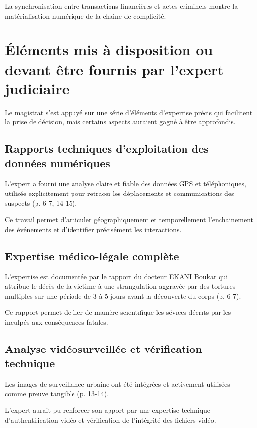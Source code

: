 \documentclass[12pt,a4paper]{article}
\begin{document}
	La synchronisation entre transactions financières et actes criminels montre la matérialisation numérique de la chaine de complicité.
	
	\section{Éléments mis à disposition ou devant être fournis par l'expert judiciaire}
	
	Le magistrat s'est appuyé sur une série d'éléments d'expertise précis qui facilitent la prise de décision, mais certains aspects auraient gagné à être approfondis.
	
	\subsection{Rapports techniques d'exploitation des données numériques}
	
	L'expert a fourni une analyse claire et fiable des données GPS et téléphoniques, utilisée explicitement pour retracer les déplacements et communications des suspects (p. 6-7, 14-15).
	
	Ce travail permet d'articuler géographiquement et temporellement l'enchainement des événements et d'identifier précisément les interactions.
	
	\subsection{Expertise médico-légale complète}
	
	L'expertise est documentée par le rapport du docteur EKANI Boukar qui attribue le décès de la victime à une strangulation aggravée par des tortures multiples sur une période de 3 à 5 jours avant la découverte du corps (p. 6-7).
	
	Ce rapport permet de lier de manière scientifique les sévices décrits par les inculpés aux conséquences fatales.
	
	\subsection{Analyse vidéosurveillée et vérification technique}
	
	Les images de surveillance urbaine ont été intégrées et activement utilisées comme preuve tangible (p. 13-14).
	
	L'expert aurait pu renforcer son apport par une expertise technique d'authentification vidéo et vérification de l'intégrité des fichiers vidéo.
	
\end{document}
